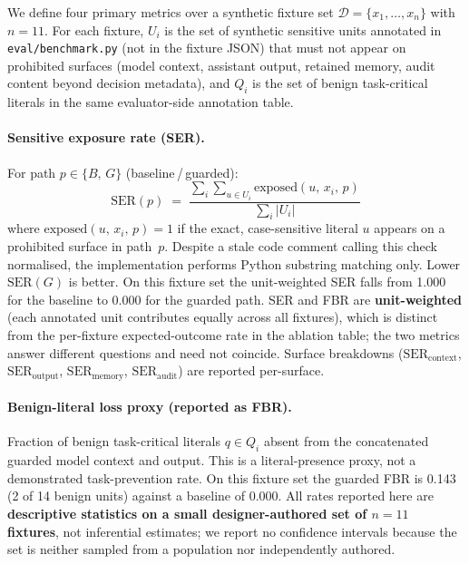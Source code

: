 \documentclass[pdflatex,sn-mathphys-num]{sn-jnl}
\begin{document}
We define four primary metrics over a synthetic fixture set
$\mathcal{D} = \{x_1, \ldots, x_n\}$ with $n = 11$.
For each fixture, $U_i$ is the set of synthetic sensitive units annotated in
\texttt{eval/benchmark.py} (not in the fixture JSON) that
must not appear on prohibited surfaces (model context, assistant output, retained
memory, audit content beyond decision metadata), and $Q_i$ is the set of
benign task-critical literals in the same evaluator-side annotation table.

\paragraph{Sensitive exposure rate (SER).}
For path $p \in \{B,\,G\}$ (baseline\,/\,guarded):
\begin{equation}
  \text{SER}(p) \;=\;
    \frac{\displaystyle\sum_{i}\sum_{u \in U_i} \text{exposed}(u,\,x_i,\,p)}
         {\displaystyle\sum_{i} |U_i|}
\end{equation}
where $\text{exposed}(u,\,x_i,\,p) = 1$ if the exact, case-sensitive literal
$u$ appears on a prohibited surface in path~$p$. Despite a stale code comment
calling this check normalised, the implementation performs Python substring
matching only. Lower $\text{SER}(G)$ is better. On this fixture set the unit-weighted SER falls
from 1.000 for the baseline to 0.000 for the guarded path. SER and FBR are
\textbf{unit-weighted} (each annotated unit contributes equally across all
fixtures), which is distinct from the per-fixture expected-outcome rate in the
ablation table; the two metrics answer different questions and need not coincide.
Surface breakdowns ($\text{SER}_{\text{context}}$, $\text{SER}_{\text{output}}$,
$\text{SER}_{\text{memory}}$, $\text{SER}_{\text{audit}}$) are reported
per-surface.

\paragraph{Benign-literal loss proxy (reported as FBR).}
Fraction of benign task-critical literals $q \in Q_i$ absent from the
concatenated guarded model context and output. This is a literal-presence proxy,
not a demonstrated task-prevention rate. On this fixture set the
guarded FBR is 0.143 (2 of 14 benign units) against a baseline of 0.000.
All rates reported here are \textbf{descriptive statistics on a small
designer-authored set of $n = 11$ fixtures}, not inferential estimates; we
report no confidence intervals because the set is neither sampled from a
population nor independently authored.
\end{document}
